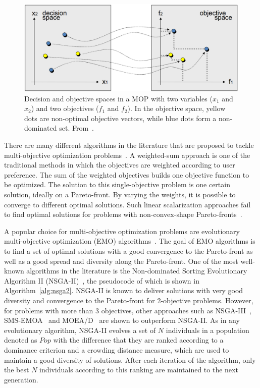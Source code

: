 \documentclass[journal]{IEEEtran}
\begin{document}
\begin{figure} [!t]
	\begin{center}
	\includegraphics[scale=0.235]{figures/perez2.png}
	\caption{Decision and objective spaces in a MOP with two variables ($x_1$ and $x_2$) and two objectives ($f_1$ and $f_2$). In the objective space, yellow dots are non-optimal objective vectors, while blue dots form a non-dominated set. From~\cite{Brockhoff2013}.}
	\label{fig:moop}
	\end{center}
\end{figure}

There are many different algorithms in the literature that are proposed to tackle multi-objective optimization problems~\cite{Deb2001}. A weighted-sum approach is one of the traditional methods in which the objectives are weighted according to user preference. The sum of the weighted objectives builds one objective function to be optimized. The solution to this single-objective problem is one certain solution, ideally on a Pareto-front. By varying the weights, it is possible to converge to different optimal solutions. Such linear scalarization approaches fail to find optimal solutions for problems with non-convex-shape Pareto-fronts~\cite{Deb2001}.


A popular choice for multi-objective optimization problems are evolutionary multi-objective optimization (EMO) algorithms~\cite{Coello1999, Zhou2011}. 
The goal of EMO algorithms is to find a set of optimal solutions with a good convergence to the Pareto-front as well as a good spread and diversity along the Pareto-front.
One of the most well-known algorithms in the literature is the Non-dominated Sorting Evolutionary Algorithm II (NSGA-{II})~\cite{Deb2002}, the pseudocode of which is shown in Algorithm~\ref{alg:nsga2}. NSGA-II is known to deliver solutions with very good diversity and convergence to the Pareto-front for 2-objective problems. However, for problems with more than 3 objectives, other approaches such as NSGA-III~\cite{Jain2013}, SMS-EMOA~\cite{Beume2007} and MOEA/D~\cite{Zhang2007a} are shown to outperform NSGA-II. As in any evolutionary algorithm, NSGA-{II} evolves a set of $N$ individuals in a population denoted as $Pop$ with the difference that they are ranked according to a dominance criterion and a crowding distance measure, which are used to maintain a good diversity of solutions. After each iteration of the algorithm, only the best $N$ individuals according to this ranking are maintained to the next generation.
\end{document}
